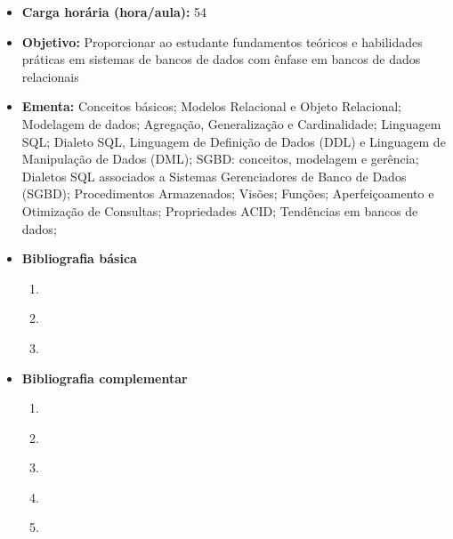 \documentclass[11pt,fleqn]{book} %
\begin{document}
\begin{itemize}
	\item \textbf{Carga horária (hora/aula):} 54
	\item \textbf{Objetivo:} Proporcionar ao estudante fundamentos teóricos e habilidades práticas em sistemas de bancos de dados com ênfase em bancos de dados relacionais
	\item \textbf{Ementa:} 
	Conceitos básicos;
	Modelos Relacional e Objeto Relacional;
	Modelagem de dados; 
	Agregação, Generalização e Cardinalidade; 
	Linguagem SQL; 
	Dialeto SQL, Linguagem de Definição de Dados (DDL) e Linguagem de Manipulação de Dados (DML);
	SGBD: conceitos, modelagem e gerência;
	Dialetos SQL associados a Sistemas Gerenciadores de Banco de Dados (SGBD);
	Procedimentos Armazenados; 
	Visões; 
	Funções; 
	Aperfeiçoamento e Otimização de Consultas;
	Propriedades ACID;
	Tendências em bancos de dados;
	\item \textbf{Bibliografia básica}
	\begin{enumerate}
		\item~\cite{silberschatz2016}
		\item \cite{elmasri_navathe_2011}
		\item~\cite{date2004}
	\end{enumerate}
	\item \textbf{Bibliografia complementar}
	\begin{enumerate}
		\item~\cite{milani2008}
		\item \cite{machado_2014}
		\item \cite{angelotti_2010}
		\item \cite{cougo_1997}
		\item \cite{toby_2007}
	\end{enumerate}	
\end{itemize}


\newpage
\end{document}

